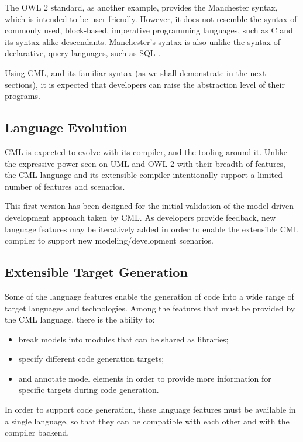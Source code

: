 The OWL 2 standard, as another example, provides the Manchester \cite{owl2manchester} syntax,
which is intended to be user-friendly.
However, it does not resemble the syntax of commonly used, block-based, imperative programming languages,
such as C \cite{clang} and its syntax-alike descendants.
Manchester's syntax is also unlike the syntax of declarative, query languages, such as SQL \cite{sql}.

Using CML,
and its familiar syntax (as we shall demonstrate in the next sections),
it is expected that developers can raise the abstraction level of their programs.

\subsection{Language Evolution}

CML is expected to evolve with its compiler, and the tooling around it.
Unlike the expressive power seen on UML \cite{uml} and OWL 2 \cite{owl2} with their breadth of features,
the CML language and its extensible compiler intentionally support a limited number of features and scenarios.

This first version has been designed for the initial validation of the model-driven development approach taken by CML.
As developers provide feedback,
new language features may be iteratively added in order to enable the extensible CML compiler to support new modeling/development scenarios.

\subsection{Extensible Target Generation}

Some of the language features enable the generation of code into a wide range of target languages and technologies. Among the features that must be provided by the CML language, there is the ability to:

\begin{itemize}
\item break models into modules that can be shared as libraries;
\item specify different code generation targets;
\item and annotate model elements in order to provide more information for specific targets during code generation.
\end{itemize}

In order to support code generation, these language features must be available in a single language, so that they can be compatible with each other and with the compiler backend.

